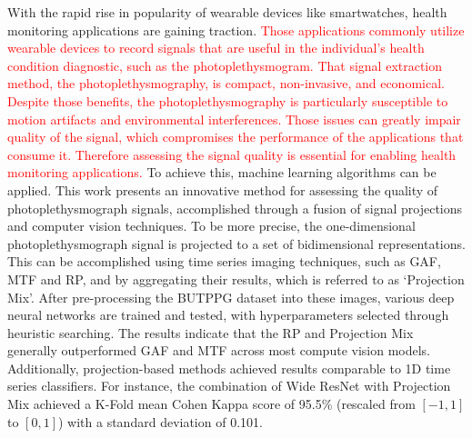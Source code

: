 

With the rapid rise in popularity of wearable devices like smartwatches, health monitoring applications are gaining traction. 
\textcolor{red}{Those applications commonly utilize wearable devices to record signals that are useful in the individual's health condition diagnostic, such as the photoplethysmogram. That signal extraction method, the photoplethysmography, is compact, non-invasive, and economical. Despite those benefits, the photoplethysmography is particularly susceptible to motion artifacts and environmental interferences. Those issues can greatly impair quality of the signal, which compromises the performance of the applications that consume it. Therefore  assessing the signal quality is essential for enabling health monitoring applications. }
%
To achieve this, machine learning algorithms can be applied. This work presents an innovative method for assessing the quality of photoplethysmograph signals, accomplished through a fusion of signal projections and computer vision techniques. To be more precise, the one-dimensional photoplethysmograph signal is projected to a set of bidimensional representations. This can be accomplished using time series imaging techniques, such as \acrlong{GAF}, \acrlong{MTF} and \acrlong{RP}, and by aggregating their results, which is referred to as `Projection Mix'. After pre-processing the \acrlong	{BUTPPG} dataset into these images, various deep neural networks are trained and tested, with hyperparameters selected through heuristic searching. The results indicate that the \acrlong{RP} and Projection Mix generally outperformed \acrlong{GAF} and \acrlong{MTF} across most compute vision models. Additionally, projection-based methods achieved results comparable to 1D time series classifiers. For instance, the combination of Wide ResNet with Projection Mix achieved a K-Fold mean Cohen Kappa score of 95.5\% (rescaled from $[-1,1]$ to $[0,1]$) with a standard deviation of 0.101. 
